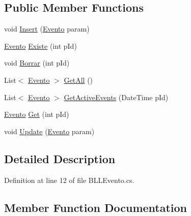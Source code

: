 \subsection*{Public Member Functions}
\begin{DoxyCompactItemize}
\item 
void \hyperlink{classprj_progra_i_i_i_1_1_layer_1_1_business___logic_1_1_b_l_l_evento_a9e31720e59b580db4bff3b1ab7d3e284}{Insert} (\hyperlink{classprj_progra_i_i_i_1_1_layer_1_1_entities_1_1_evento}{Evento} param)
\item 
\hyperlink{classprj_progra_i_i_i_1_1_layer_1_1_entities_1_1_evento}{Evento} \hyperlink{classprj_progra_i_i_i_1_1_layer_1_1_business___logic_1_1_b_l_l_evento_a5ac56339dc498598e31c5e3dd2c89975}{Existe} (int p\+Id)
\item 
void \hyperlink{classprj_progra_i_i_i_1_1_layer_1_1_business___logic_1_1_b_l_l_evento_a2678321a8382a9304c95e8fc996d088e}{Borrar} (int p\+Id)
\item 
List$<$ \hyperlink{classprj_progra_i_i_i_1_1_layer_1_1_entities_1_1_evento}{Evento} $>$ \hyperlink{classprj_progra_i_i_i_1_1_layer_1_1_business___logic_1_1_b_l_l_evento_a5b9114ece4753c247a3ad365ca543da2}{Get\+All} ()
\item 
List$<$ \hyperlink{classprj_progra_i_i_i_1_1_layer_1_1_entities_1_1_evento}{Evento} $>$ \hyperlink{classprj_progra_i_i_i_1_1_layer_1_1_business___logic_1_1_b_l_l_evento_a72838525485eaff7c98c698dac7e5f71}{Get\+Active\+Events} (Date\+Time p\+Id)
\item 
\hyperlink{classprj_progra_i_i_i_1_1_layer_1_1_entities_1_1_evento}{Evento} \hyperlink{classprj_progra_i_i_i_1_1_layer_1_1_business___logic_1_1_b_l_l_evento_a7aeead199812f2510ee3087a7d022c4e}{Get} (int p\+Id)
\item 
void \hyperlink{classprj_progra_i_i_i_1_1_layer_1_1_business___logic_1_1_b_l_l_evento_ad9bbb373b1a005e7ef584586ad20f387}{Update} (\hyperlink{classprj_progra_i_i_i_1_1_layer_1_1_entities_1_1_evento}{Evento} param)
\end{DoxyCompactItemize}


\subsection{Detailed Description}


Definition at line 12 of file B\+L\+L\+Evento.\+cs.



\subsection{Member Function Documentation}
\hypertarget{classprj_progra_i_i_i_1_1_layer_1_1_business___logic_1_1_b_l_l_evento_a2678321a8382a9304c95e8fc996d088e}{}\label{classprj_progra_i_i_i_1_1_layer_1_1_business___logic_1_1_b_l_l_evento_a2678321a8382a9304c95e8fc996d088e} 
